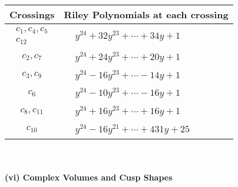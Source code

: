 \documentclass[1p]{elsarticle_modified}
\theoremstyle{definition}
\begin{document}
\begin{tabular}{m{50pt}|m{274pt}}
Crossings & \hspace{64pt}Riley Polynomials at each crossing \\
\hline $$\begin{aligned}c_{1},c_{4},c_{5}\\c_{12}\end{aligned}$$&$\begin{aligned}
&y^{24}+32 y^{23}+\cdots+34 y+1
\end{aligned}$\\
\hline $$\begin{aligned}c_{2},c_{7}\end{aligned}$$&$\begin{aligned}
&y^{24}+24 y^{23}+\cdots+20 y+1
\end{aligned}$\\
\hline $$\begin{aligned}c_{3},c_{9}\end{aligned}$$&$\begin{aligned}
&y^{24}-16 y^{23}+\cdots-14 y+1
\end{aligned}$\\
\hline $$\begin{aligned}c_{6}\end{aligned}$$&$\begin{aligned}
&y^{24}-10 y^{23}+\cdots-16 y+1
\end{aligned}$\\
\hline $$\begin{aligned}c_{8},c_{11}\end{aligned}$$&$\begin{aligned}
&y^{24}+16 y^{23}+\cdots+16 y+1
\end{aligned}$\\
\hline $$\begin{aligned}c_{10}\end{aligned}$$&$\begin{aligned}
&y^{24}-16 y^{21}+\cdots+431 y+25
\end{aligned}$\\
\hline
\end{tabular}\\~\\
\newpage\flushleft \textbf{(vi) Complex Volumes and Cusp Shapes}
\end{document}

